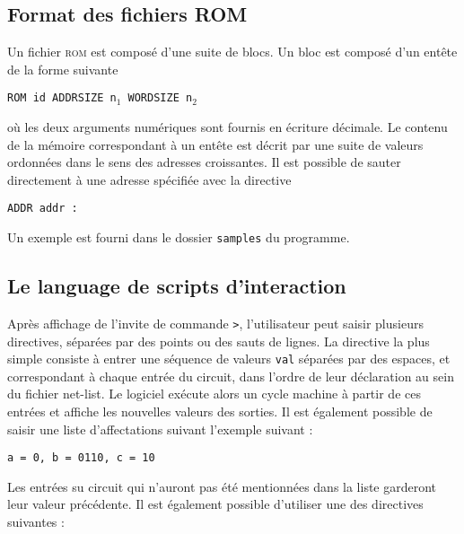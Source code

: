 \documentclass[11pt, a4paper]{article}
\newcommand{\prog}[1]{{\tt#1}}
\begin{document}
\subsection{Format des fichiers ROM}

Un fichier \textsc{rom} est composé d'une suite de blocs. Un bloc est composé d'un entête de la forme suivante
\begin{center}\prog{ROM id ADDRSIZE n$_1$ WORDSIZE n$_2$ }\end{center}
où les deux arguments numériques sont fournis en écriture décimale. Le contenu de la mémoire correspondant à un entête est décrit par une suite de valeurs ordonnées dans le sens des adresses croissantes. Il est possible de sauter directement à une adresse spécifiée avec la directive 
\begin{center}\prog{ADDR addr :}\end{center}
Un exemple est fourni dans le dossier \prog{samples} du programme.

\subsection{Le language de scripts d'interaction}

\medskip

Après affichage de l'invite de commande \prog{>}, l'utilisateur peut saisir plusieurs directives, séparées par des points ou des sauts de lignes. La directive la plus simple consiste à entrer une séquence de valeurs \prog{val} séparées par des espaces, et correspondant à chaque entrée du circuit, dans l'ordre de leur déclaration au sein du fichier net-list. Le logiciel exécute alors un cycle machine à partir de ces entrées et affiche les nouvelles valeurs des sorties. Il est également possible de saisir une liste d'affectations suivant l'exemple suivant :
\begin{center}
\prog{a = 0, b = 0110, c = 10}
\end{center}
Les entrées su circuit qui n'auront pas été mentionnées dans la liste garderont leur valeur précédente. Il est également possible d'utiliser une des directives suivantes :
\end{document}
